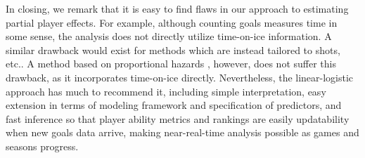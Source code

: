 In closing, we remark that it is easy to find flaws in our approach to
estimating partial player effects.  For example, although counting goals
measures time in some sense, the analysis does not directly utilize
time-on-ice information.  A similar drawback would exist for methods which are
instead tailored to shots, etc..  A method based on proportional hazards
\cite{ThoVenJen12}, however, does not suffer this drawback, as it incorporates
time-on-ice directly.  Nevertheless, the linear-logistic approach has much
to recommend it, including simple interpretation, easy extension in terms
of modeling framework and specification of predictors, and fast inference
so that player ability metrics and rankings are easily updatability when
new goals data arrive, making near-real-time analysis possible as games
and seasons progress.


